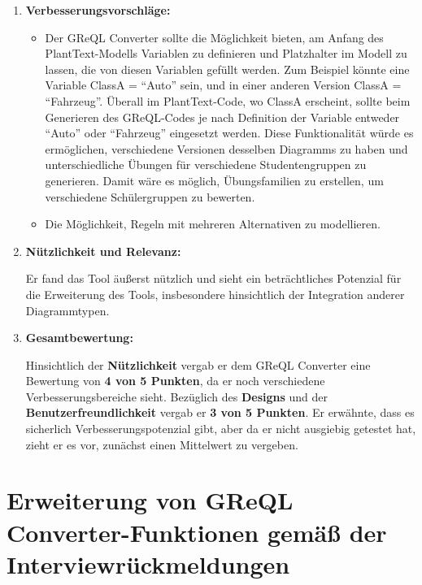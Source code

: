 \begin{enumerate}[itemsep=8pt, parsep=5pt]
    \item \textbf{Verbesserungsvorschläge:}

    \begin{itemize}[itemsep=8pt, parsep=5pt]
        \item Der GReQL Converter sollte die Möglichkeit bieten, am Anfang des PlantText-Modells Variablen zu
        definieren und Platzhalter im Modell zu lassen, die von diesen Variablen gefüllt werden. Zum Beispiel könnte
        eine Variable ClassA = ``Auto'' sein, und in einer anderen Version ClassA = ``Fahrzeug''. Überall im
        PlantText-Code, wo ClassA erscheint, sollte beim Generieren des GReQL-Codes je nach Definition der Variable
        entweder ``Auto'' oder ``Fahrzeug'' eingesetzt werden. Diese Funktionalität würde es ermöglichen, verschiedene
        Versionen desselben Diagramms zu haben und unterschiedliche Übungen für verschiedene Studentengruppen zu
        generieren. Damit wäre es möglich, Übungsfamilien zu erstellen, um verschiedene Schülergruppen zu bewerten.

        \item Die Möglichkeit, Regeln mit mehreren Alternativen zu modellieren.
    \end{itemize}

    \item \textbf{Nützlichkeit und Relevanz:}

    Er fand das Tool äußerst nützlich und sieht ein beträchtliches Potenzial für die Erweiterung des Tools,
    insbesondere hinsichtlich der Integration anderer Diagrammtypen.

    \item \textbf{Gesamtbewertung:}

    Hinsichtlich der \textbf{Nützlichkeit} vergab er dem GReQL Converter eine Bewertung von \textbf{4 von 5 Punkten},
    da er noch verschiedene Verbesserungsbereiche sieht. Bezüglich des \textbf{Designs} und der
    \textbf{Benutzerfreundlichkeit} vergab er \textbf{3 von 5 Punkten}. Er erwähnte, dass es sicherlich
    Verbesserungspotenzial gibt, aber da er nicht ausgiebig getestet hat, zieht er es vor, zunächst einen
    Mittelwert zu vergeben.

\end{enumerate}


\section{Erweiterung von GReQL Converter-Funktionen gemäß der Interviewrückmeldungen}

